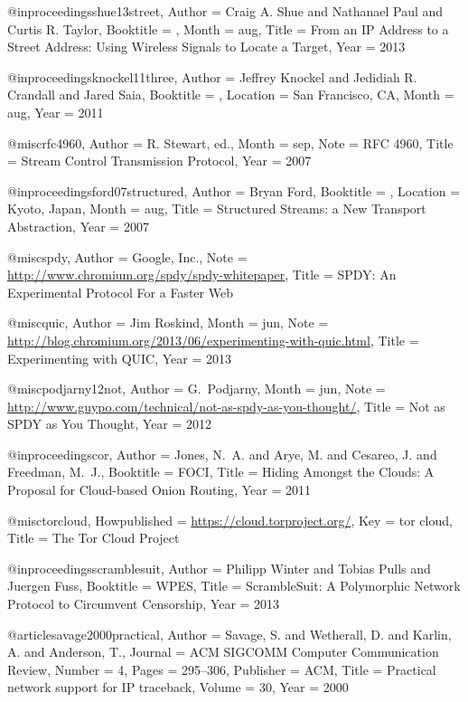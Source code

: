 {{{{{	@inproceedings{shue13street,
	Author = {Craig A. Shue and Nathanael Paul and Curtis R. Taylor},
	Booktitle = {},
	Month = aug,
	Title = {From an {IP} Address to a Street Address: Using Wireless Signals to Locate a Target},
	Year = 2013}
	
	@inproceedings{knockel11three,
	Author = {Jeffrey Knockel and Jedidiah R. Crandall and Jared Saia},
	Booktitle = {},
	Location = {San Francisco, CA},
	Month = aug,
	Year = 2011}
	
	@misc{rfc4960,
	Author = {R. {Stewart, ed.}},
	Month = sep,
	Note = {RFC 4960},
	Title = {Stream Control Transmission Protocol},
	Year = 2007}
	
	@inproceedings{ford07structured,
	Author = {Bryan Ford},
	Booktitle = {},
	Location = {Kyoto, Japan},
	Month = aug,
	Title = {Structured Streams: a New Transport Abstraction},
	Year = {2007}}
	
	@misc{spdy,
	Author = {Google, Inc.},
	Note = {\url{http://www.chromium.org/spdy/spdy-whitepaper}},
	Title = {{SPDY}: An Experimental Protocol For a Faster {Web}}}
	
	@misc{quic,
	Author = {Jim Roskind},
	Month = jun,
	Note = {\url{http://blog.chromium.org/2013/06/experimenting-with-quic.html}},
	Title = {Experimenting with {QUIC}},
	Year = 2013}
	
	@misc{podjarny12not,
	Author = {G.~Podjarny},
	Month = jun,
	Note = {\url{http://www.guypo.com/technical/not-as-spdy-as-you-thought/}},
	Title = {{Not as SPDY as You Thought}},
	Year = 2012}
	
	@inproceedings{cor,
	Author = {Jones, N.~A. and Arye, M. and Cesareo, J. and Freedman, M.~J.},
	Booktitle = {FOCI},
	Title = {{Hiding Amongst the Clouds: A Proposal for Cloud-based Onion Routing}},
	Year = {2011}}
	
	@misc{torcloud,
	Howpublished = {\url{https://cloud.torproject.org/}},
	Key = {tor cloud},
	Title = {{The Tor Cloud Project}}}
	
	@inproceedings{scramblesuit,
	Author = {Philipp Winter and Tobias Pulls and Juergen Fuss},
	Booktitle = {WPES},
	Title = {{ScrambleSuit: A Polymorphic Network Protocol to Circumvent Censorship}},
	Year = 2013}
	
	@article{savage2000practical,
	Author = {Savage, S. and Wetherall, D. and Karlin, A. and Anderson, T.},
	Journal = {ACM SIGCOMM Computer Communication Review},
	Number = {4},
	Pages = {295--306},
	Publisher = {ACM},
	Title = {Practical network support for IP traceback},
	Volume = {30},
	Year = {2000}}
	
}}}}}
